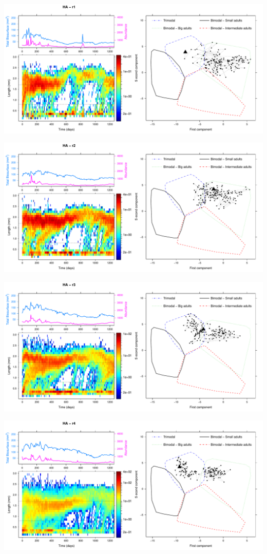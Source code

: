 ~
\includegraphics[height=0.33\textheight]{3-1_ChapExp1/Fig/HA-21-r1}

\includegraphics[height=0.33\textheight]{3-1_ChapExp1/Fig/HA-21-r2}

\includegraphics[height=0.33\textheight]{3-1_ChapExp1/Fig/HA-21-r3}

\includegraphics[height=0.33\textheight]{3-1_ChapExp1/Fig/HA-21-r4}

